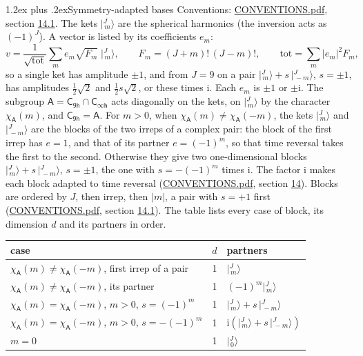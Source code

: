 \documentclass[10pt,a4paper]{article}
\makeatletter
\renewcommand\section{\@startsection{section}{1}{\z@}{-3ex plus -1ex minus -.2ex}%
  {1.2ex plus .2ex}{\normalfont\large\sffamily\bfseries\color{parttitle}}}
\numberwithin{equation}{section}
\newcommand{\grp}[1]{\mathsf{#1}}
\newcommand{\iunit}{\mathrm{i}}
\newcommand{\chiA}{\chi_{\grp{A}}}
\newcommand{\jm}[2]{\bigl\lvert{}^{#1}_{\,#2}\bigr\rangle}
\makeatother
\begin{document}
\section{Symmetry-adapted bases}\label{s:bases}
Conventions: \href{../../CONVENTIONS.pdf}{CONVENTIONS.pdf}, section \href{../../CONVENTIONS.pdf\#conv.14.1}{14.1}.
\leavevmode\label{n:index.m}\label{n:vector.ket}The kets $\jm{J}{m}$ are the spherical harmonics (the inversion acts as $(-1)^J$). \label{n:index.ketcoefficient}\label{n:vector.basis.symmetry}\label{n:index.ketweight}\label{n:index.total}A vector is listed by its coefficients $e_m$:
\begin{equation}\label{e:ket}v = \frac{1}{\sqrt{\mathrm{tot}}}\sum_m e_m\sqrt{F_m}\;\jm{J}{m},\qquad F_m = (J+m)!\,(J-m)!,\qquad \mathrm{tot} = \sum_m |e_m|^2F_m,\end{equation}
\leavevmode\label{n:index.pair.sign}so a single ket has amplitude $\pm1$, and from $J = 9$ on a pair $\jm{J}{m} + s\,\jm{J}{-m}$, $s = \pm1$, has amplitudes $\tfrac{1}{2}\sqrt{2}$ and $\tfrac{1}{2}s\sqrt{2}$, or these times $\iunit$. Each $e_m$ is $\pm1$ or $\pm\iunit$.
\leavevmode\label{n:group.A}\label{n:function.character.abelian}The subgroup $\grp{A} = \grp{C_{9h}}\cap\grp{C_{\infty h}}$ acts diagonally on the kets, on $\jm{J}{m}$ by the character $\chiA(m)$, and $\grp{C_{9h}} = \grp{A}$. For $m > 0$, when $\chiA(m) \ne \chiA(-m)$, the kets $\jm{J}{m}$ and $\jm{J}{-m}$ are the blocks of the two irreps of a complex pair: the block of the first irrep has $e = 1$, and that of its partner $e = (-1)^m$, so that time reversal takes the first to the second. Otherwise they give two one-dimensional blocks $\jm{J}{m} + s\,\jm{J}{-m}$, $s = \pm1$, the one with $s = -(-1)^m$ times $\iunit$. The factor $\iunit$ makes each block adapted to time reversal (\href{../../CONVENTIONS.pdf}{CONVENTIONS.pdf}, section \href{../../CONVENTIONS.pdf\#conv.14}{14}). Blocks are ordered by $J$, then irrep, then $|m|$, a pair with $s = +1$ first (\href{../../CONVENTIONS.pdf}{CONVENTIONS.pdf}, section \href{../../CONVENTIONS.pdf\#conv.14.1}{14.1}).
\leavevmode\label{n:head.case}\label{n:head.partners}The table lists every case of block, its dimension $d$ and its partners in order.
\begin{center}\begin{tabular}{@{}lrl@{}}\toprule
case & $d$ & partners\\\midrule
$\chiA(m) \ne \chiA(-m)$, first irrep of a pair & 1 & $\jm{J}{m}$\\
$\chiA(m) \ne \chiA(-m)$, its partner & 1 & $(-1)^m\jm{J}{m}$\\
$\chiA(m) = \chiA(-m)$, $m > 0$, $s = (-1)^m$ & 1 & $\jm{J}{m} + s\,\jm{J}{-m}$\\
$\chiA(m) = \chiA(-m)$, $m > 0$, $s = -(-1)^m$ & 1 & $\iunit(\jm{J}{m} + s\,\jm{J}{-m})$\\
$m = 0$ & 1 & $\jm{J}{0}$\\
\bottomrule\end{tabular}\end{center}
\end{document}

